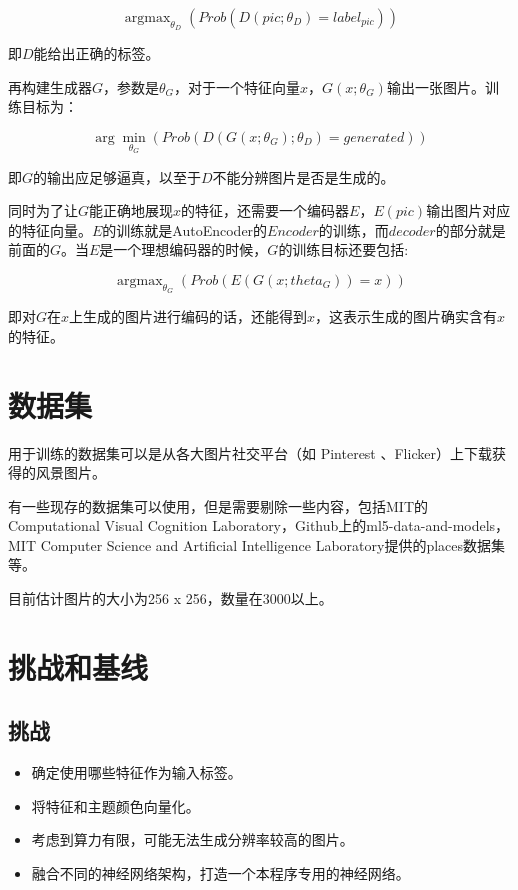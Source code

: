 \documentclass{article}
\begin{document}
$$\mathop{\arg\max}_{\theta_D}(Prob(D(pic; \theta_D)=label_{pic}))$$

即$D$能给出正确的标签。

再构建生成器$G$，参数是$\theta_G$，对于一个特征向量$x$，$G(x; \theta_G)$输出一张图片。训练目标为：

$$\arg\min_{\theta_G}(Prob(D(G(x; \theta_G); \theta_D)=generated))$$

即$G$的输出应足够逼真，以至于$D$不能分辨图片是否是生成的。

同时为了让$G$能正确地展现$x$的特征，还需要一个编码器$E$，$E(pic)$输出图片对应的特征向量。$E$的训练就是AutoEncoder的$Encoder$的训练，而$decoder$的部分就是前面的$G$。当$E$是一个理想编码器的时候，$G$的训练目标还要包括:

$$\mathop{\arg\max}_{\theta_G}(Prob(E(G(x; theta_G))=x))$$

即对$G$在$x$上生成的图片进行编码的话，还能得到$x$，这表示生成的图片确实含有$x$的特征。


\section{数据集}

用于训练的数据集可以是从各大图片社交平台（如 Pinterest 、Flicker）上下载获得的风景图片。

有一些现存的数据集可以使用，但是需要剔除一些内容，包括MIT的Computational Visual Cognition Laboratory，Github上的ml5-data-and-models，MIT Computer Science and Artificial Intelligence Laboratory提供的places数据集等。

目前估计图片的大小为256 x 256，数量在3000以上。

\section{挑战和基线}

\subsection{挑战}
\begin{itemize}
	\item 确定使用哪些特征作为输入标签。
	\item 将特征和主题颜色向量化。
	\item 考虑到算力有限，可能无法生成分辨率较高的图片。
	\item 融合不同的神经网络架构，打造一个本程序专用的神经网络。
\end{itemize}
\end{document}
